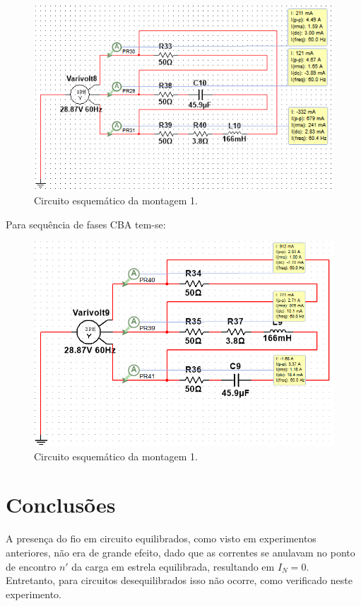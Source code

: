 \documentclass[a4paper,12pt,oneside,openany,table,xcdraw]{article}
\begin{document}
\begin{figure}[H]
\centering
\includegraphics[width=13.5cm]{m3-esquema-abc-correntes}
\caption{Circuito esquemático da montagem 1.}
\label{m2:IL}
\end{figure}

Para sequência de fases CBA tem-se: 

\begin{figure}[H]
\centering
\includegraphics[width=13.5cm]{m3-esquema-cba-correntes}
\caption{Circuito esquemático da montagem 1.}
\label{m2:IL}
\end{figure}


\newpage
\section{Conclusões} %
A presença do fio em circuito equilibrados, como visto em experimentos anteriores, não era de grande efeito, dado que as correntes se anulavam no ponto de encontro $n'$ da carga em estrela equilibrada, resultando em $I_N=0$. Entretanto, para circuitos desequilibrados isso não ocorre, como verificado neste experimento.
\end{document}
